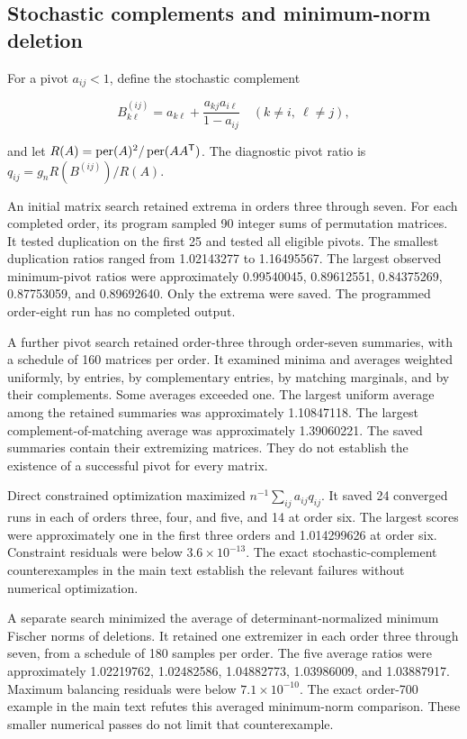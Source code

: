 \subsection{Stochastic complements and minimum-norm deletion}\label{app:finite-12}

For a pivot \(a_{ij}<1\), define the stochastic complement

\[
B^{(ij)}_{k\ell}=a_{k\ell}+\frac{a_{kj}a_{i\ell}}{1-a_{ij}}
\quad(k\ne i,\ \ell\ne j),
\]

and let \(R(A)=\operatorname{per}(A)^2/\operatorname{per}(AA^{\mathsf{T}})\). The diagnostic pivot ratio is \(q_{ij}=g_nR(B^{(ij)})/R(A)\).

An initial matrix search retained extrema in orders three through seven. For each completed order, its program sampled 90 integer sums of permutation matrices. It tested duplication on the first 25 and tested all eligible pivots. The smallest duplication ratios ranged from 1.02143277 to 1.16495567. The largest observed minimum-pivot ratios were approximately 0.99540045, 0.89612551, 0.84375269, 0.87753059, and 0.89692640. Only the extrema were saved. The programmed order-eight run has no completed output.

A further pivot search retained order-three through order-seven summaries, with a schedule of 160 matrices per order. It examined minima and averages weighted uniformly, by entries, by complementary entries, by matching marginals, and by their complements. Some averages exceeded one. The largest uniform average among the retained summaries was approximately 1.10847118. The largest complement-of-matching average was approximately 1.39060221. The saved summaries contain their extremizing matrices. They do not establish the existence of a successful pivot for every matrix.

Direct constrained optimization maximized \(n^{-1}\sum_{ij}a_{ij}q_{ij}\). It saved 24 converged runs in each of orders three, four, and five, and 14 at order six. The largest scores were approximately one in the first three orders and 1.014299626 at order six. Constraint residuals were below \(3.6\times10^{-13}\). The exact stochastic-complement counterexamples in the main text establish the relevant failures without numerical optimization.

A separate search minimized the average of determinant-normalized minimum Fischer norms of deletions. It retained one extremizer in each order three through seven, from a schedule of 180 samples per order. The five average ratios were approximately 1.02219762, 1.02482586, 1.04882773, 1.03986009, and 1.03887917. Maximum balancing residuals were below \(7.1\times10^{-10}\). The exact order-700 example in the main text refutes this averaged minimum-norm comparison. These smaller numerical passes do not limit that counterexample.

